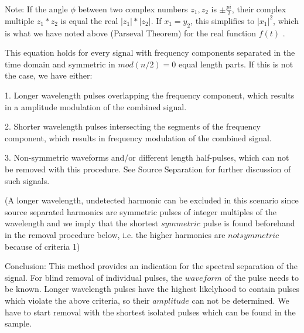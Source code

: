\documentclass{article}
\renewcommand{\baselinestretch}{2}
\begin{document}
Note: If the angle $\phi$ between two complex numbers $z_{1},z_{2}$ is $\pm\frac{pi}{2}$, their complex multiple $z_{1}*z_{2}$ is equal the real $\lvert z_{1}\rvert*\lvert z_{2}\rvert$. If $x_{1}=y_{2}$, this simplifies to $\lvert x_{1} \rvert ^2$, which is what we have noted above (Parseval Theorem) for the real function $f(t)$ .

\renewcommand{\baselinestretch}{1}

This equation holds for every signal with frequency components separated in the time domain and symmetric in $mod(n/2)=0$ equal length parts. If this is not the case, we have either:

1. Longer wavelength pulses overlapping the frequency component, which results in a amplitude modulation of the combined signal.

2. Shorter wavelength pulses intersecting the segments of the frequency component, which results in frequency modulation of the combined signal.

3. Non-symmetric waveforms and/or different length half-pulses, which can not be removed with this procedure. See Source Separation for further discussion of such signals.

(A longer wavelength, undetected harmonic can be excluded in this scenario since source separated harmonics are symmetric pulses of integer multiples of the wavelength and we imply that the shortest $symmetric$ pulse is found beforehand in the removal procedure below, i.e. the higher harmonics are $not symmetric$ because of criteria 1)

Conclusion: This method provides an indication for the spectral separation of the signal. For blind removal of individual pulses, the $waveform$ of the pulse needs to be known. Longer wavelength pulses have the highest likelyhood to contain pulses which violate the above criteria, so their $amplitude$ can not be determined. We have to start removal with the shortest isolated pulses which can be found in the sample.
\end{document}
